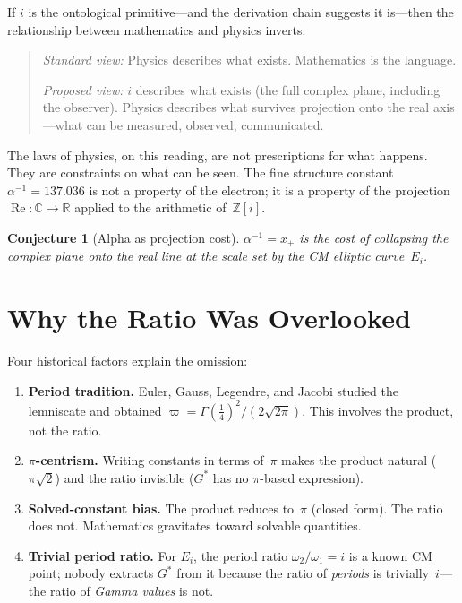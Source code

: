 \documentclass[12pt,reqno]{amsart}
\newtheorem{conjecture}[theorem]{Conjecture}
\theoremstyle{definition}
\theoremstyle{remark}
\newcommand{\ZZ}{\mathbb{Z}}
\newcommand{\RR}{\mathbb{R}}
\newcommand{\CC}{\mathbb{C}}
\newcommand{\Gstar}{G^{\!*}}
\newcommand{\re}{\operatorname{Re}}
\begin{document}
If $i$ is the ontological primitive---and the derivation chain suggests it
is---then the relationship between mathematics and physics inverts:

\begin{quote}
\emph{Standard view:} Physics describes what exists. Mathematics is the language.

\smallskip
\emph{Proposed view:} $i$ describes what exists (the full complex plane,
including the observer). Physics describes what survives projection onto
the real axis---what can be measured, observed, communicated.
\end{quote}

The laws of physics, on this reading, are not prescriptions for what happens.
They are constraints on what can be seen. The fine structure constant
$\alpha^{-1}=137.036$ is not a property of the electron; it is a property of
the projection $\re\colon\CC\to\RR$ applied to the arithmetic of~$\ZZ[i]$.

\begin{conjecture}[Alpha as projection cost]
$\alpha^{-1}=x_+$ is the cost of collapsing the complex plane onto the real
line at the scale set by the CM elliptic curve~$E_i$.
\end{conjecture}

\section{Why the Ratio Was Overlooked}

Four historical factors explain the omission:
\begin{enumerate}[nosep]
  \item \textbf{Period tradition.} Euler, Gauss, Legendre, and Jacobi studied
    the lemniscate and obtained $\varpi=\Gamma(\tfrac14)^2/(2\sqrt{2\pi})$.
    This involves the product, not the ratio.
  \item \textbf{$\pi$-centrism.} Writing constants in terms of~$\pi$ makes the
    product natural ($\pi\sqrt{2}$) and the ratio invisible ($\Gstar$ has no
    $\pi$-based expression).
  \item \textbf{Solved-constant bias.} The product reduces to~$\pi$ (closed form).
    The ratio does not. Mathematics gravitates toward solvable quantities.
  \item \textbf{Trivial period ratio.} For $E_i$, the period ratio
    $\omega_2/\omega_1=i$ is a known CM point; nobody extracts $\Gstar$ from it
    because the ratio of \emph{periods} is trivially~$i$---the ratio of
    \emph{Gamma values} is not.
\end{enumerate}
\end{document}
